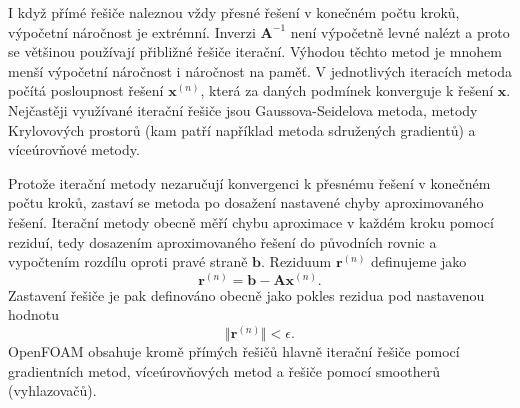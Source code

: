 \documentclass[a4paper,12pt]{report}
\theoremstyle{remark}
\begin{document}
	I když přímé řešiče naleznou vždy přesné řešení v konečném počtu kroků, výpočetní náročnost je extrémní. Inverzi $\boldsymbol{A} ^{-1}$ není výpočetně levné nalézt a proto se většinou používají přibližné řešiče iterační. Výhodou těchto metod je mnohem menší výpočetní náročnost i náročnost na paměť. V jednotlivých iteracích metoda počítá posloupnost řešení $\boldsymbol{x}^{(n)}$, která za daných podmínek konverguje k řešení $\boldsymbol{x}$.  Nejčastěji využívané iterační řešiče jsou Gaussova-Seidelova metoda, metody Krylovových prostorů (kam patří například metoda sdružených gradientů) a víceúrovňové metody.
	
	Protože iterační metody nezaručují konvergenci k přesnému řešení v konečném počtu kroků, zastaví se metoda po dosažení nastavené chyby aproximovaného řešení. Iterační metody obecně měří chybu aproximace v každém kroku pomocí reziduí, tedy dosazením aproximovaného řešení do původních rovnic a vypočtením rozdílu oproti pravé straně $\boldsymbol{b}$. Reziduum $\boldsymbol{r} ^{(n)} $ definujeme jako 
	\begin{equation}
		\boldsymbol{r} ^{(n)} = \boldsymbol{b}-\boldsymbol{A} \boldsymbol{x}^{(n)}.
		\label{eq:residuum}
	\end{equation} 
Zastavení řešiče je pak definováno obecně jako pokles rezidua pod nastavenou hodnotu
\begin{equation}
	\Vert{\boldsymbol{r}^{(n)}}\Vert < \epsilon.
\end{equation}
	OpenFOAM obsahuje kromě přímých řešičů hlavně iterační řešiče pomocí gradientních metod, víceúrovňových metod a řešiče pomocí smootherů (vyhlazovačů).
	
\end{document}
